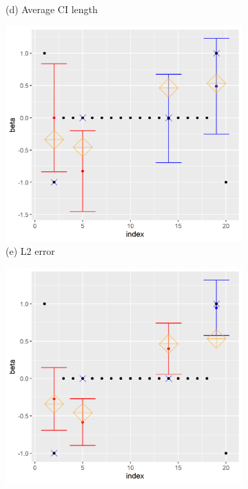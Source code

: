 \begin{figure}[ht!]
\begin{subfigure}[b]{.32\columnwidth}
    \caption{(d) Average CI length}
\end{subfigure}
\hfill
\centering
\begin{subfigure}[b]{.32\columnwidth} 
    \includegraphics[width=\columnwidth]{../../plot/p1_20_1_1.png}
    \caption{(e) L2 error}
\end{subfigure}
\hfill
\centering
\begin{subfigure}[b]{.32\columnwidth} 
    \includegraphics[width=\columnwidth]{../../plot/p2_20_1_1.png}

\end{subfigure}
\end{figure}
